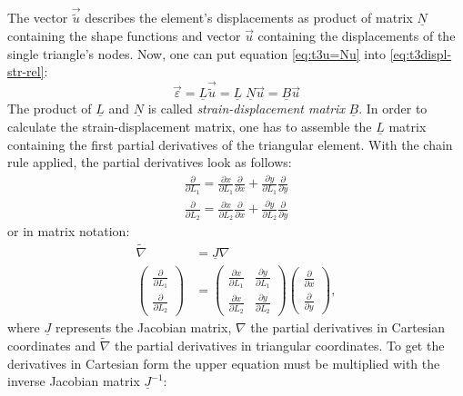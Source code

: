   The vector $\vec{\tilde{u}}$ describes the element's displacements as product of matrix $\underline{N}$ containing the shape functions and vector $\vec{u}$ containing the displacements of the single triangle's nodes. Now, one can put equation \eqref{eq:t3u=Nu} into \eqref{eq:t3displ-str-rel}:
  \begin{equation}\label{eq:t3eps=Bu}
  \vec{\varepsilon} = \underline{L}\vec{\tilde{u}} = \underline{L}\;\underline{N} \vec{u} = \underline{B} \vec{u}
  \end{equation}
  The product of $\underline{L}$ and $\underline{N}$ is called \textit{strain-displacement matrix} $\underline{B}$.
  In order to calculate the strain-displacement matrix, one has to assemble the $\underline{L}$ matrix containing the first partial derivatives of the triangular element. With the chain rule applied, the partial derivatives look as follows:
  \begin{align}
  \frac{\partial}{\partial L_1} = \frac{\partial x}{\partial L_1} \frac{\partial}{\partial x} + \frac{\partial y}{\partial L_1} \frac{\partial}{\partial y} \nonumber\\
  \frac{\partial}{\partial L_2} = \frac{\partial x}{\partial L_2} \frac{\partial}{\partial x} + \frac{\partial y}{\partial L_2} \frac{\partial}{\partial y}
  \end{align}
  or in matrix notation:
  \begin{align}\label{eq:t3NablaTilde}
  \tilde{\nabla} &= \underline{J} \nabla \nonumber\\
  \begin{pmatrix}
  \frac{\partial}{\partial L_1}\\ \frac{\partial}{\partial L_2}
  \end{pmatrix} &= \begin{pmatrix}
  \frac{\partial x}{\partial L_1} & \frac{\partial y}{\partial L_1}\\
  \frac{\partial x}{\partial L_2} & \frac{\partial y}{\partial L_2}
  \end{pmatrix} \begin{pmatrix}
  \frac{\partial}{\partial x}\\ \frac{\partial}{\partial y}
  \end{pmatrix},
  \end{align}
  where $\underline{J}$ represents the Jacobian matrix, $\nabla$ the partial derivatives in Cartesian coordinates and $\tilde{\nabla}$ the partial derivatives in triangular coordinates. To get the derivatives in Cartesian form the upper equation must be multiplied with the inverse Jacobian matrix $\underline{J}^{-1}$:
